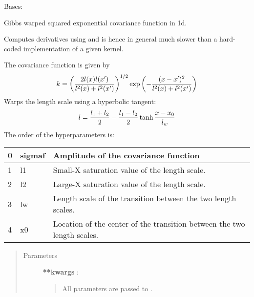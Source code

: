 \documentclass[letterpaper,10pt,english]{sphinxmanual}
\begin{document}
\begin{fulllineitems}
\label{gptools.kernel:gptools.kernel.gibbs.GibbsKernel1dtanh}
Bases: {\hyperref[gptools.kernel:gptools.kernel.core.ArbitraryKernel]{}}

Gibbs warped squared exponential covariance function in 1d.

Computes derivatives using  and is hence in general
much slower than a hard-coded implementation of a given kernel.

The covariance function is given by
\begin{gather}
\begin{split}k = \left ( \frac{2l(x)l(x')}{l^2(x)+l^2(x')} \right )^{1/2}\exp\left ( -\frac{(x-x')^2}{l^2(x)+l^2(x')} \right )\end{split}\notag
\end{gather}
Warps the length scale using a hyperbolic tangent:
\begin{gather}
\begin{split}l = \frac{l_1 + l_2}{2} - \frac{l_1 - l_2}{2}\tanh\frac{x-x_0}{l_w}\end{split}\notag
\end{gather}
The order of the hyperparameters is:

\begin{tabulary}{\linewidth}{|L|L|L|}
\hline

0
 & 
sigmaf
 & 
Amplitude of the covariance function
\\\hline

1
 & 
l1
 & 
Small-X saturation value of the length scale.
\\\hline

2
 & 
l2
 & 
Large-X saturation value of the length scale.
\\\hline

3
 & 
lw
 & 
Length scale of the transition between the two length scales.
\\\hline

4
 & 
x0
 & 
Location of the center of the transition between the two length scales.
\\\hline
\end{tabulary}

\begin{quote}\begin{description}
\item[{Parameters }] \leavevmode
\textbf{**kwargs} :
\begin{quote}

All parameters are passed to {\hyperref[gptools.kernel:gptools.kernel.core.Kernel]{}}.
\end{quote}

\end{description}\end{quote}

\end{fulllineitems}
\end{document}
